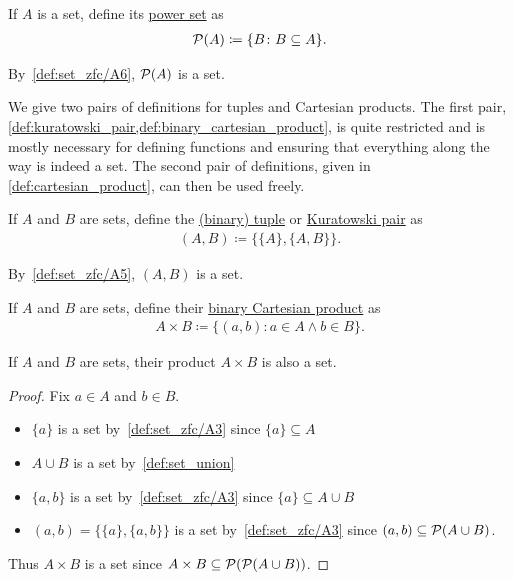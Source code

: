 \begin{definition}\label{def:power_set}\cite[4]{Lectures:general_topology}
  If $A$ is a set, define its \uline{power set} as
  \begin{align*}
    \operatorname{\mathcal P}(A) \coloneqq \{ B \colon B \subseteq A \}.
  \end{align*}

  By~\ref{def:set_zfc/A6}, $\operatorname{\mathcal P}(A)$ is a set.
\end{definition}

\begin{note}
  We give two pairs of definitions for tuples and Cartesian products. The first pair, \cref{def:kuratowski_pair,def:binary_cartesian_product}, is quite restricted and is mostly necessary for defining functions and ensuring that everything along the way is indeed a set. The second pair of definitions, given in \cref{def:cartesian_product}, can then be used freely.
\end{note}

\begin{definition}\label{def:kuratowski_pair}\cite[4]{Lectures:general_topology}
  If $A$ and $B$ are sets, define the \uline{(binary) tuple} or \uline{Kuratowski pair} as
  \begin{align*}
    (A, B) \coloneqq \{ \{ A \}, \{ A, B \} \}.
  \end{align*}

  By~\ref{def:set_zfc/A5}, $(A, B)$ is a set.
\end{definition}

\begin{definition}\label{def:binary_cartesian_product}\cite[4]{Lectures:general_topology}
  If $A$ and $B$ are sets, define their \uline{binary Cartesian product} as
  \begin{align*}
    A \times B \coloneqq \{ (a, b) \colon a \in A \land b \in B \}.
  \end{align*}
\end{definition}

\begin{proposition}
  If $A$ and $B$ are sets, their product $A \times B$ is also a set.
\end{proposition}
\begin{proof}
  Fix $a \in A$ and $b \in B$.
  \begin{itemize}
    \item $\{ a \}$ is a set by~\ref{def:set_zfc/A3} since $\{ a \} \subseteq A$
    \item $A \cup B$ is a set by~\cref{def:set_union}
    \item $\{ a, b \}$ is a set by~\ref{def:set_zfc/A3} since $\{ a \} \subseteq A \cup B$
    \item $(a, b) = \{ \{ a \}, \{ a, b \} \}$ is a set by~\ref{def:set_zfc/A3} since $(a, b) \subseteq \operatorname{\mathcal P}(A \cup B)$.
  \end{itemize}

  Thus $A \times B$ is a set since $A \times B \subseteq \operatorname{\mathcal P}(\operatorname{\mathcal P}(A \cup B))$.
\end{proof}

